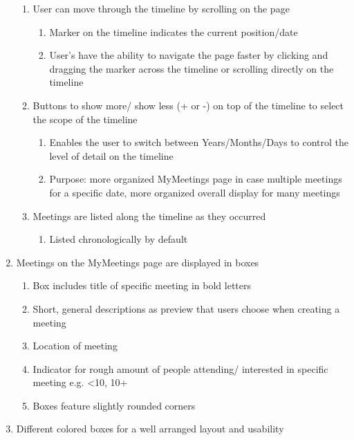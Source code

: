 \documentclass[conference]{IEEEtran}
\begin{document}
\begin{enumerate}
    \begin{enumerate}
        \item User can move through the timeline by scrolling on the page
        \begin{enumerate}
            \item Marker on the timeline indicates the current position/date
            \item User’s have the ability to navigate the page faster by clicking and dragging the marker across the timeline or scrolling directly on the timeline
        \end{enumerate}
        \item Buttons to show more/ show less (+ or -) on top of the timeline to select the scope of the timeline
        \begin{enumerate}
            \item Enables the user to switch between Years/Months/Days to control the level of detail on the timeline
            \item Purpose: more organized MyMeetings page in case multiple meetings for a specific date, more organized overall display for many meetings
        \end{enumerate}
        \item Meetings are listed along the timeline as they occurred
        \begin{enumerate}
            \item Listed chronologically by default
        \end{enumerate}
    \end{enumerate}
    \item  Meetings on the MyMeetings page are displayed in boxes
    \begin{enumerate}
        \item Box includes title of specific meeting in bold letters
        \item Short, general descriptions as preview that users choose when creating a meeting
        \item Location of meeting
        \item Indicator for rough amount of people attending/ interested in specific meeting e.g. <10, 10+
        \item Boxes feature slightly rounded corners
    \end{enumerate}
    \item Different colored boxes for a well arranged layout and usability
    \begin{enumerate}

\end{enumerate}
\end{enumerate}
\end{document}
